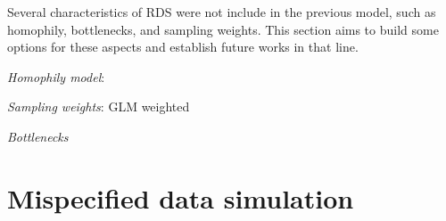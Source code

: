 Several characteristics of RDS were not include in the previous model, such as
homophily, bottlenecks, and sampling weights. This section aims to build some
options for these aspects and establish future works in that line. 

\begin{alineas}
  \item {\em Homophily model}: \cite{yauck2021general} 
  \item {\em Sampling weights}: GLM weighted
  \item {\em Bottlenecks}
\end{alineas}

\section{Mispecified data simulation}

